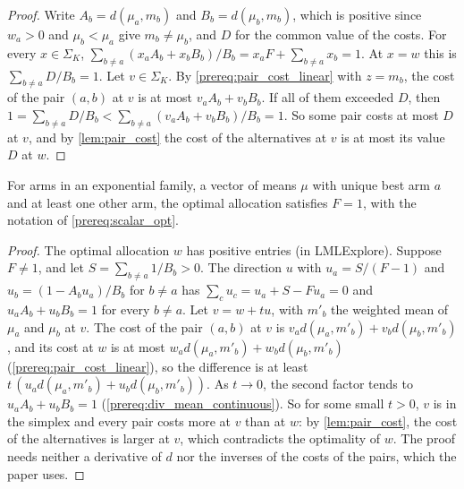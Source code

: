 \begin{proof}
  \leanok
  Write $A_b = d(\mu_a, m_b)$ and $B_b = d(\mu_b, m_b)$, which is positive since $w_a > 0$ and
  $\mu_b < \mu_a$ give $m_b \ne \mu_b$, and $D$ for the common value of the costs. For every
  $x \in \Sigma_K$, $\sum_{b \ne a} (x_a A_b + x_b B_b) / B_b = x_a F + \sum_{b \ne a} x_b = 1$.
  At $x = w$ this is $\sum_{b \ne a} D / B_b = 1$. Let $v \in \Sigma_K$. By
  \cref{prereq:pair_cost_linear} with $z = m_b$, the cost of the pair $(a, b)$ at $v$ is at most
  $v_a A_b + v_b B_b$. If all of them exceeded $D$, then
  $1 = \sum_{b \ne a} D / B_b < \sum_{b \ne a} (v_a A_b + v_b B_b) / B_b = 1$. So some pair costs
  at most $D$ at $v$, and by \cref{lem:pair_cost} the cost of the alternatives at $v$ is at most
  its value $D$ at $w$.
\end{proof}

\begin{lemma}
  \label{prereq:scalar_eq}
  \leanok
  For arms in an exponential family, a vector of means $\mu$ with unique best arm $a$ and at
  least one other arm, the optimal allocation satisfies $F = 1$, with the notation of
  \cref{prereq:scalar_opt}.
\end{lemma}

\begin{proof}
  \leanok
  The optimal allocation $w$ has positive entries (in LMLExplore). Suppose $F \ne 1$, and let
  $S = \sum_{b \ne a} 1 / B_b > 0$. The direction $u$ with $u_a = S / (F - 1)$ and
  $u_b = (1 - A_b u_a) / B_b$ for $b \ne a$ has $\sum_c u_c = u_a + S - F u_a = 0$ and
  $u_a A_b + u_b B_b = 1$ for every $b \ne a$. Let $v = w + t u$, with $m'_b$ the weighted mean
  of $\mu_a$ and $\mu_b$ at $v$. The cost of the pair $(a, b)$ at $v$ is
  $v_a d(\mu_a, m'_b) + v_b d(\mu_b, m'_b)$, and its cost at $w$ is at most
  $w_a d(\mu_a, m'_b) + w_b d(\mu_b, m'_b)$ (\cref{prereq:pair_cost_linear}), so the difference
  is at least $t\,(u_a d(\mu_a, m'_b) + u_b d(\mu_b, m'_b))$. As $t \to 0$, the second factor tends
  to $u_a A_b + u_b B_b = 1$ (\cref{prereq:div_mean_continuous}). So for some small $t > 0$, $v$
  is in the simplex and every pair costs more at $v$ than at $w$: by \cref{lem:pair_cost}, the
  cost of the alternatives is larger at $v$, which contradicts the optimality of $w$. The proof
  needs neither a derivative of $d$ nor the inverses of the costs of the pairs, which the paper
  uses.
\end{proof}

